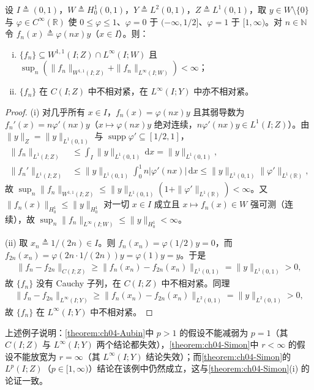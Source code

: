 \documentclass[../../main.tex]{subfiles}%
\begin{document}
\begin{example}\label{example:ch04-紧嵌入临界失效}
设 $I\triangleq(0,1)$，$W\triangleq H^1_0(0,1)$，$Y\triangleq L^2(0,1)$，$Z\triangleq L^1(0,1)$，取 $y\in W\setminus\{0\}$ 与 $\varphi\in C^\infty(\mathbb{R})$ 使 $0\leqslant\varphi\leqslant1$、$\varphi=0$ 于 $(-\infty,1/2]$、$\varphi=1$ 于 $[1,\infty)$。对 $n\in\mathbb{N}$ 令 $f_n(x)\triangleq\varphi(nx)y$（$x\in I$）。则：
\begin{enumerate}[(i)]
\item $\{f_n\}\subseteq W^{1,1}(I;Z)\cap L^\infty(I;W)$ 且 $\sup_n(\|f_n\|_{W^{1,1}(I;Z)}+\|f_n\|_{L^\infty(I;W)})<\infty$；
\item $\{f_n\}$ 在 $C(I;Z)$ 中不相对紧，在 $L^\infty(I;Y)$ 中亦不相对紧。
\end{enumerate}
\end{example}

\begin{proof}
(i) 对几乎所有 $x\in I$，$f_n(x)=\varphi(nx)y$ 且其弱导数为 $f_n'(x)=n\varphi'(nx)y$（$x\mapsto\varphi(nx)y$ 绝对连续，$n\varphi'(nx)y\in L^1(I;Z)$）。由 $\|y\|_{Z}=\|y\|_{L^1(0,1)}$ 与 $\operatorname{supp}\varphi'\subseteq[1/2,1]$，
\begin{align*}
\|f_n\|_{L^1(I;Z)}&\leqslant\int_I\|y\|_{L^1(0,1)}\,\mathrm{d}x=\|y\|_{L^1(0,1)},\\
\|f_n'\|_{L^1(I;Z)}&\leqslant\|y\|_{L^1(0,1)}\int_0^1n|\varphi'(nx)|\,\mathrm{d}x\leqslant\|y\|_{L^1(0,1)}\|\varphi'\|_{L^1(\mathbb{R})},
\end{align*}
故 $\sup_n\|f_n\|_{W^{1,1}(I;Z)}\leqslant\|y\|_{L^1(0,1)}(1+\|\varphi'\|_{L^1(\mathbb{R})})<\infty$。又 $\|f_n(x)\|_{H^1_0}\leqslant\|y\|_{H^1_0}$ 对一切 $x\in I$ 成立且 $x\mapsto f_n(x)\in W$ 强可测（连续），故 $\sup_n\|f_n\|_{L^\infty(I;W)}\leqslant\|y\|_{H^1_0}<\infty$。

(ii) 取 $x_n\triangleq1/(2n)\in I$。则 $f_n(x_n)=\varphi(1/2)y=0$，而 $f_{2n}(x_n)=\varphi(2n\cdot1/(2n))y=\varphi(1)y=y$。于是
\begin{align*}
\|f_n-f_{2n}\|_{C(I;Z)}\geqslant\|f_n(x_n)-f_{2n}(x_n)\|_{L^1(0,1)}=\|y\|_{L^1(0,1)}>0,
\end{align*}
故 $\{f_n\}$ 没有 Cauchy 子列，在 $C(I;Z)$ 中不相对紧。同理
\begin{align*}
\|f_n-f_{2n}\|_{L^\infty(I;Y)}\geqslant\|f_n(x_n)-f_{2n}(x_n)\|_{L^2(0,1)}=\|y\|_{L^2(0,1)}>0,
\end{align*}
故 $\{f_n\}$ 在 $L^\infty(I;Y)$ 中不相对紧。
\end{proof}

上述例子说明：\cref{theorem:ch04-Aubin}中 $p>1$ 的假设不能减弱为 $p=1$（其 $C(I;Z)$ 与 $L^\infty(I;Y)$ 两个结论都失效），\cref{theorem:ch04-Simon}中 $r<\infty$ 的假设不能放宽为 $r=\infty$（其 $L^\infty(I;Y)$ 结论失效）；而\cref{theorem:ch04-Simon}的 $L^p(I;Z)$（$p\in[1,\infty)$）结论在该例中仍然成立，这与\cref{theorem:ch04-Simon}(i) 的论证一致。
\end{document}
